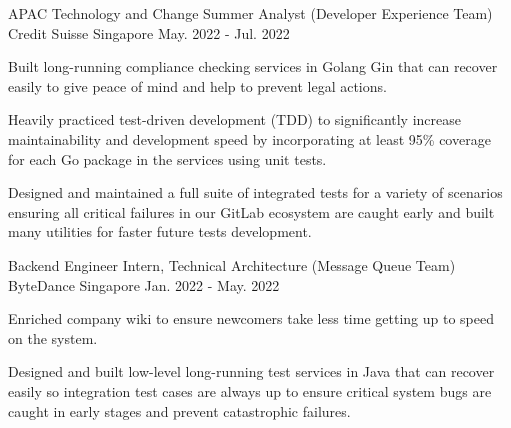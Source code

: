

\begin{cventries}
  \cventry
    {APAC Technology and Change Summer Analyst (Developer Experience Team)} %
    {Credit Suisse} %
    {Singapore} %
    {May. 2022 - Jul. 2022} %
    {
      \begin{cvitems} %
        \item {Built long-running compliance checking services in Golang Gin that can recover easily to give peace of mind and help to prevent legal actions.}
        \item {Heavily practiced test-driven development (TDD) to significantly increase maintainability and development speed by incorporating at least 95\% coverage for each Go package in the services using unit tests.}
        \item {Designed and maintained a full suite of integrated tests for a variety of scenarios ensuring all critical failures in our GitLab ecosystem are caught early and built many utilities for faster future tests development.}
      \end{cvitems}
    }

  \cventry
    {Backend Engineer Intern, Technical Architecture (Message Queue Team)} %
    {ByteDance} %
    {Singapore} %
    {Jan. 2022 - May. 2022} %
    {
      \begin{cvitems} %
        \item {Enriched company wiki to ensure newcomers take less time getting up to speed on the system.}
        \item {Designed and built low-level long-running test services in Java that can recover easily so integration test cases are always up to ensure critical system bugs are caught in early stages and prevent catastrophic failures.}
      \end{cvitems}
    }


\end{cventries}
